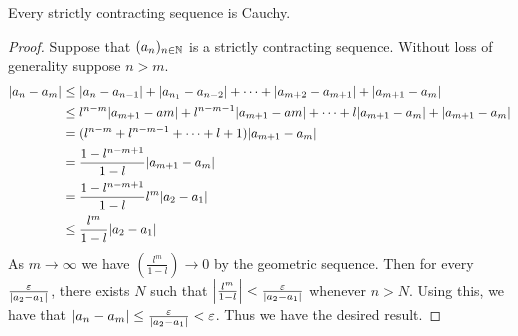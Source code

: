 \documentclass[a4paper]{article}
\begin{document}
\begin{thm}{}{} Every strictly contracting sequence is Cauchy. \tcbline
\begin{proof} Suppose that $(a_n)_{n\in\mathbb{N}}$ is a strictly contracting sequence. Without loss of generality suppose $n>m$. 
\begin{align*}
\abs{a_n-a_m}&\leq\abs{a_n-a_{n-1}}+\abs{a_{n_1}-a_{n-2}}+\dots+\abs{a_{m+2}-a_{m+1}}+\abs{a_{m+1}-a_m} \\
&\leq l^{n-m}\abs{a_{m+1}-a{m}}+l^{n-m-1}\abs{a_{m+1}-a{m}}+\dots+l\abs{a_{m+1}-a_m}+\abs{a_{m+1}-a_m} \\
&=(l^{n-m}+l^{n-m-1}+\dots+l+1)\abs{a_{m+1}-a_m} \\
&=\frac{1-l^{n-m+1}}{1-l}\abs{a_{m+1}-a_m} \\
&=\frac{1-l^{n-m+1}}{1-l}l^m\abs{a_2-a_1} \\
&\leq\frac{l^m}{1-l}\abs{a_2-a_1}
\end{align*}
As $m\to\infty$ we have $\left(\frac{l^m}{1-l}\right)\to0$ by the geometric sequence. Then for every $\frac{\varepsilon}{\abs{a_2-a_1}}$, there exists $N$ such that $\abs{\frac{l^m}{1-l}}<\frac{\varepsilon}{\abs{a_2-a_1}}$ whenever $n>N$. Using this, we have that $\abs{a_n-a_m}\leq\frac{\varepsilon}{\abs{a_2-a_1}}<\varepsilon$. Thus we have the desired result. 
\end{proof}
\end{thm}
\end{document}

